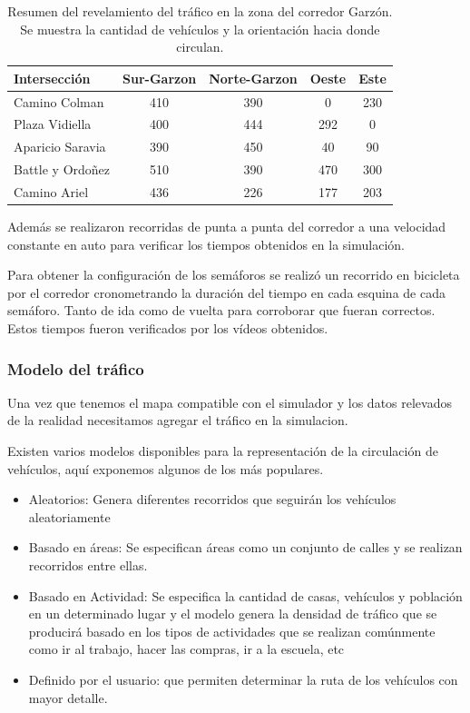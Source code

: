 \begin{table}[h]
	\renewcommand{\arraystretch}{1.2}
	\caption{Resumen del revelamiento del tráfico en la zona del corredor Garzón. Se muestra la cantidad de vehículos  y la orientación hacia donde circulan. }
	\label{table:resumen_trafico}
	\centering
	\begin{tabular}{lcccc}
		\hline
		Intersección&
		Sur-Garzon& 
		Norte-Garzon & 
		Oeste &
		Este 
		\\ 
		\hline
		Camino Colman  & 410 & 390 & 0 & 230\\		
		Plaza Vidiella  & 400 & 444 & 292 & 0\\		
		Aparicio Saravia  & 390 & 450 & 40 & 90\\		
		Battle y Ordoñez  & 510 & 390 & 470 & 300 \\	
		Camino Ariel  & 436 & 226 & 177 & 203 \\													
		\hline
		
		
		\hline
	\end{tabular}
\end{table}


Además se realizaron recorridas de punta a punta del corredor a una velocidad constante en auto para verificar los tiempos obtenidos en la simulación.

Para obtener la configuración de los semáforos se realizó un recorrido en bicicleta por el corredor cronometrando la duración del tiempo en cada esquina de cada semáforo. Tanto de ida como de vuelta para corroborar que fueran correctos. Estos tiempos fueron verificados por los vídeos obtenidos.


\newpage
\subsubsection{Modelo del tráfico}
Una vez que tenemos el mapa compatible con el simulador y los datos relevados de la realidad necesitamos agregar el tráfico en la simulacion.

Existen varios modelos disponibles para la representación de la circulación de vehículos, aquí exponemos algunos de los más populares. 
\begin{itemize}
	\item Aleatorios: Genera diferentes recorridos que seguirán los vehículos aleatoriamente
	\item Basado en áreas:  Se especifican áreas como un conjunto de calles y se realizan recorridos entre ellas.
	\item Basado en Actividad: Se especifica la cantidad de casas, vehículos y población en un determinado lugar y el modelo genera la densidad de tráfico que se producirá basado en los tipos de actividades que se realizan comúnmente como ir al trabajo, hacer las compras, ir a la escuela,  etc
	\item Definido por el usuario: que permiten determinar la ruta de los vehículos con mayor detalle.
\end{itemize}



